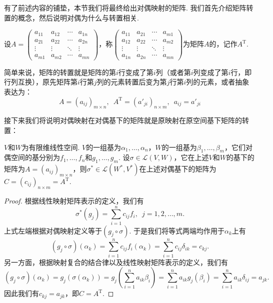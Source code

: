 有了前述内容的铺垫，本节我们将最终给出对偶映射的矩阵. 我们首先介绍矩阵转置的概念，然后说明对偶为什么与转置相关.
\begin{definition}[转置] 
    设$A=\begin{pmatrix}
            a_{11} & a_{12} & \cdots & a_{1n} \\
            a_{21} & a_{22} & \cdots & a_{2n} \\
            \vdots & \vdots & \ddots & \vdots \\
            a_{m1} & a_{m2} & \cdots & a_{mn}
        \end{pmatrix}$，称$\begin{pmatrix}
            a_{11} & a_{21} & \cdots & a_{m1} \\
            a_{12} & a_{22} & \cdots & a_{m2} \\
            \vdots & \vdots & \ddots & \vdots \\
            a_{1n} & a_{2n} & \cdots & a_{mn}
        \end{pmatrix}$为矩阵$A$的，记作$A^\mathrm{T}$.
\end{definition}

简单来说，矩阵的转置就是矩阵的第$i$行变成了第$i$列（或者第$i$列变成了第$i$行，即行列互换），原先矩阵第$i$行第$j$列的元素转置后变为第$j$行第$i$列的元素，或者抽象表达为：
\[A=(a_{ij})_{m \times n},\enspace A^\mathrm{T}=(a'_{ji})_{n \times m},\enspace a_{ij}=a'_{ji}\]

接下来我们将说明对偶映射在对偶基下的矩阵就是原映射在原空间基下矩阵的转置：
\begin{theorem}
    $V$和$W$为有限维线性空间. $V$的一组基为$\alpha_1,\ldots,\alpha_n$，$W$的一组基为$\beta_1,\ldots,\beta_m$，它们对偶空间的基分别为$f_1,\ldots,f_n$和$g_1,\ldots,g_m$. 设$\sigma\in\mathcal{L}(V,W)$，它在上述$V$和$W$的基下的矩阵为$A=(a_{ij})_{m \times n}$，则$\sigma^*\in\mathcal{L}(W^*,V^*)$在上述对偶基下的矩阵为$C=(c_{ij})_{n \times m}=A^\mathrm{T}$.
\end{theorem}

\begin{proof}
    根据线性映射矩阵表示的定义，我们有
    \[\sigma^*(g_j)=\sum_{i=1}^nc_{ij}f_i,\enspace j=1,2,\ldots,m.\]
    上式左端根据对偶映射定义等于$(g_j\circ\sigma)$. 于是我们将等式两端均作用于$\alpha_k$上有
    \[(g_j\circ\sigma)(\alpha_k)=\sum_{i=1}^nc_{ij}f_i(\alpha_k)=\sum_{i=1}^nc_{ij}\delta_{ik}=c_{kj}.\]
    另一方面，根据映射复合的结合律以及线性映射矩阵表示的定义，我们有
    \[(g_j\circ\sigma)(\alpha_k)=g_j(\sigma(\alpha_k))=g_j\left(\sum_{i=1}^na_{ik}\beta_i\right)=\sum_{i=1}^na_{ik}g_j(\beta_i)=\sum_{i=1}^na_{ik}\delta_{ij}=a_{jk}.\]
    因此我们有$c_{kj}=a_{jk}$，即$C=A^\mathrm{T}$.
\end{proof}

